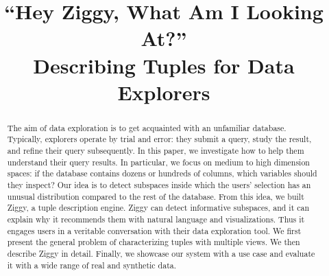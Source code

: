 \documentclass{sig-alternate-2015}
\begin{document}
\title{``Hey Ziggy, What Am I Looking At?''\\
Describing Tuples for Data Explorers}


\maketitle

\begin{abstract} 
The aim of data exploration is to get acquainted with an unfamiliar database.
Typically, explorers operate by trial and error: they submit a query, study the
result, and refine their query subsequently. In this paper, we investigate how
to help them understand their query results. In particular, we focus on medium
to high dimension spaces: if the database contains dozens or hundreds of
columns, which variables should they inspect? Our idea is to detect subspaces
inside which the users' selection has an unusual distribution compared to the
rest of the database. From this idea, we built Ziggy, a tuple description
engine. Ziggy can detect informative subspaces, and it can explain why it
recommends them with natural language and visualizations. Thus it engages users
in a veritable conversation with their data exploration tool.  We first present
the general problem of characterizing tuples with multiple views. We then
describe Ziggy in detail. Finally, we showcase our system with a use case and
evaluate it with a wide range of real and synthetic data.
\end{abstract}






\balance

\end{document}
